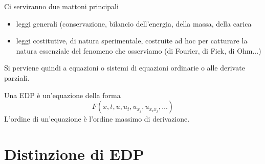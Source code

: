 \documentclass[10pt,a4paper,twoside,openright]{book}
\begin{document}
Ci serviranno due mattoni principali
\begin{itemize}
\item leggi generali (conservazione, bilancio dell'energia, della massa, della carica
\item leggi costitutive, di natura sperimentale, costruite ad hoc per catturare la natura essenziale del fenomeno che osserviamo (di Fourier, di Fiek, di Ohm...)
\end{itemize}

Si perviene quindi a equazioni o sistemi di equazioni ordinarie o alle derivate parziali.

Una EDP è un'equazione della forma
\begin{equation*}
F( x,t,u,u_{t},u_{x_{j}},u_{x_{i} x_{j}},\dotsc)
\end{equation*}
L'ordine di un'equazione è l'ordine massimo di derivazione.
\section{Distinzione di EDP}
\end{document}
